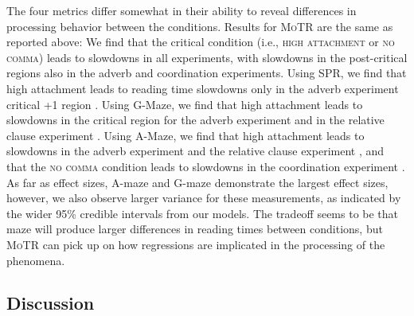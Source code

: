 \documentclass[12pt]{article}
\newcommand{\motr}{\textsc{MoTR}\xspace}
\newcommand{\nocomma}{\textsc{no comma}\xspace}
\newcommand{\highattach}{\textsc{high attachment}\xspace}
\begin{document}
{The four metrics differ somewhat in their ability to reveal differences in processing behavior between the conditions. Results for \motr are the same as reported above: We find that the critical condition (i.e., \highattach or \nocomma) leads to slowdowns in all experiments, with slowdowns in the post-critical regions also in the adverb and coordination experiments. Using SPR, we find that high attachment leads to reading time slowdowns only in the adverb experiment critical +1 region . Using G-Maze, we find that high attachment leads to slowdowns in the critical region for the adverb experiment  and in the relative clause experiment . Using A-Maze, we find that high attachment leads to slowdowns in the adverb experiment  and the relative clause experiment , and that the \nocomma condition leads to slowdowns in the coordination experiment . As far as effect sizes, A-maze and G-maze demonstrate the largest effect sizes, however, we also observe larger variance for these measurements, as indicated by the wider 95\% credible intervals from our models. The tradeoff seems to be that maze will produce larger differences in reading times between conditions, but \motr can pick up on how regressions are implicated in the processing of the phenomena.


\subsection{Discussion}

}
\end{document}
